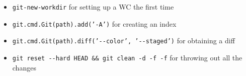 \documentclass[deska]{subfiles}
\begin{document}
\begin{itemize}
    \item {\tt git-new-workdir} for setting up a WC the first time
    \item {\tt git.cmd.Git(path).add('-A')} for creating an index
    \item {\tt git.cmd.Git(path).diff('-{-}color', '-{-}staged')} for obtaining a diff
    \item {\tt git reset -{-}hard HEAD \&\& git clean -d -f -f} for throwing out all the changes
\end{itemize}
\end{document}
